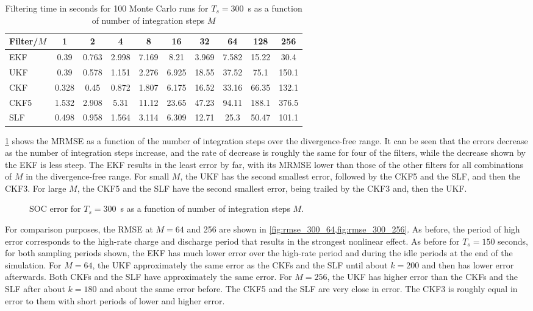 \documentclass[../zhang_thesis.tex]{subfiles}
\begin{document}
\begin{table}[h]
\centering
\caption{Filtering time in seconds for 100 Monte Carlo runs for $T_s=300$~s as a function of number of integration steps $M$}
\begin{tabular}{@{}lccccccccc@{}}
\toprule
Filter/$M$ & 1     & 2     & 4     & 8     & 16    & 32    & 64    & 128   & 256   \\ \midrule
EKF        & 0.39  & 0.763 & 2.998 & 7.169 & 8.21  & 3.969 & 7.582 & 15.22 & 30.4  \\
UKF        & 0.39  & 0.578 & 1.151 & 2.276 & 6.925 & 18.55 & 37.52 & 75.1  & 150.1 \\
CKF        & 0.328 & 0.45  & 0.872 & 1.807 & 6.175 & 16.52 & 33.16 & 66.35 & 132.1 \\
CKF5       & 1.532 & 2.908 & 5.31  & 11.12 & 23.65 & 47.23 & 94.11 & 188.1 & 376.5 \\
SLF        & 0.498 & 0.958 & 1.564 & 3.114 & 6.309 & 12.71 & 25.3  & 50.47 & 101.1 \\ \bottomrule
\end{tabular}
\label{tab:time_300}
\end{table}

\cref{fig:mrmse_300} shows the MRMSE as a function of the number of integration steps over the divergence-free range. It can be seen that the errors decrease as the number of integration steps increase, and the rate of decrease is roughly the same for four of the filters, while the decrease shown by the EKF is less steep. The EKF results in the least error by far, with its MRMSE lower than those of the other filters for all combinations of $M$ in the divergence-free range. For small $M$, the UKF has the second smallest error, followed by the CKF5 and the SLF, and then the CKF3. For large $M$, the CKF5 and the SLF have the second smallest error, being trailed by the CKF3 and, then the UKF.

\begin{figure}[ht]
\centering
%
\caption{SOC error for $T_s=300$~s as a function of number of integration steps $M$.}
\label{fig:mrmse_300}
\end{figure}

For comparison purposes, the RMSE at $M=64$ and 256 are shown in \cref{fig:rmse_300_64,fig:rmse_300_256}. As before, the period of high error corresponds to the high-rate charge and discharge period that results in the strongest nonlinear effect. As before for $T_s=150$ seconds, for both sampling periods shown, the EKF has much lower error over the high-rate period and during the idle periods at the end of the simulation. For $M=64$, the UKF approximately the same error as the CKFs and the SLF until about $k=200$ and then has lower error afterwards. Both CKFs and the SLF have approximately the same error. For $M=256$, the UKF has higher error than the CKFs and the SLF after about $k=180$ and about the same error before. The CKF5 and the SLF are very close in error. The CKF3 is roughly equal in error to them with short periods of lower and higher error.
\end{document}
